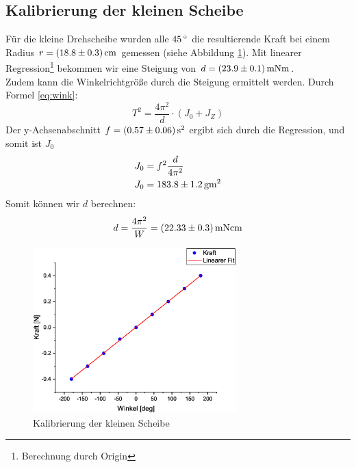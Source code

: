 \subsection{Kalibrierung der kleinen Scheibe}
Für die kleine Drehscheibe wurden alle $\unit[45]{^\circ}$ die resultierende Kraft bei einem Radius $r = \unit[(18.8 \pm 0.3)]{cm}$ gemessen (siehe Abbildung \ref{fig:kal1}). Mit linearer Regression\footnote{Berechnung durch Origin} bekommen wir eine Steigung von $d = \unit[(23.9 \pm 0.1)]{mN m}$.\\
Zudem kann die Winkelrichtgröße durch die Steigung ermittelt werden. Durch Formel \ref{eq:wink}:
\begin{equation}
T^2 = \frac{4\pi^2}{d}\cdot (J_0+J_Z)
\end{equation}
Der y-Achsenabschnitt $f = \unit[(0.57 \pm 0.06)]{s^2}$ ergibt sich durch die Regression, und somit ist $J_0$
\begin{align}
J_0 &= f^2\frac{d}{4\pi^2}\\
J_0 &= \unit[183.8 \pm 1.2]{g m^2}
\end{align}
Somit können wir $d$ berechnen:
\begin{equation*}
d = \frac{4\pi^2}{W} = \unit[(22.33 \pm 0.3)]{mN cm}
\end{equation*}


\begin{figure}
\begin{center}
\includegraphics[width=0.7\textwidth]{Bilder/kal1.eps}
\caption{Kalibrierung der kleinen Scheibe}
\label{fig:kal1}
\end{center}
\end{figure}
